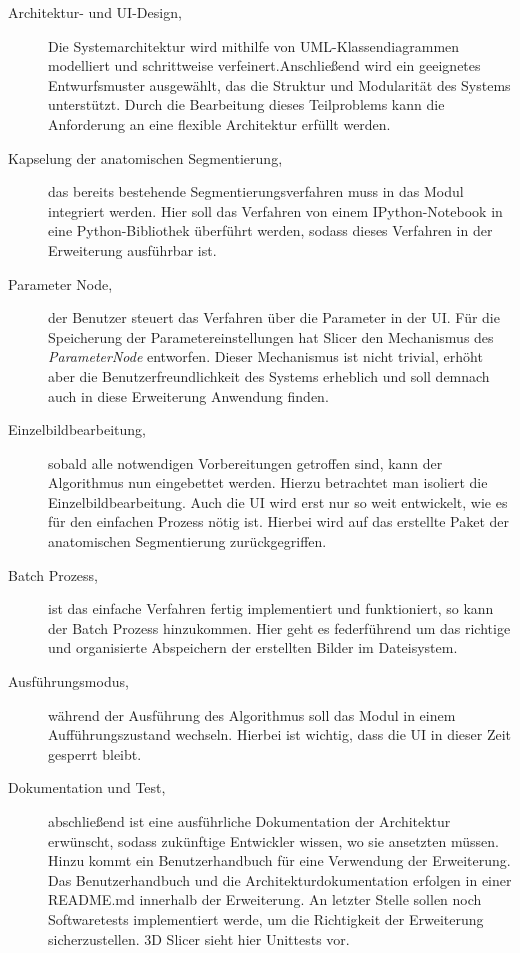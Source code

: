 \begin{description}
	\item[Architektur- und \ac{UI}-Design,] Die Systemarchitektur wird mithilfe von
		\ac{UML}-Klassendiagrammen modelliert und schrittweise verfeinert.Anschließend
		wird ein geeignetes Entwurfsmuster ausgewählt, das die Struktur und Modularität
		des Systems unterstützt. Durch die Bearbeitung dieses Teilproblems kann die
		Anforderung an eine flexible Architektur erfüllt werden.

	\item[Kapselung der anatomischen Segmentierung,] das bereits bestehende Segmentierungsverfahren
		muss in das Modul integriert werden. Hier soll das Verfahren von einem
		IPython-Notebook in eine Python-Bibliothek überführt werden, sodass dieses Verfahren
		in der Erweiterung ausführbar ist.

	\item[Parameter Node,] der Benutzer steuert das Verfahren über die Parameter in
		der \ac{UI}. Für die Speicherung der Parametereinstellungen hat Slicer den Mechanismus
		des \textit{ParameterNode} entworfen. Dieser Mechanismus ist nicht trivial,
		erhöht aber die Benutzerfreundlichkeit des Systems erheblich und soll
		demnach auch in diese Erweiterung Anwendung finden.

	\item[Einzelbildbearbeitung,] sobald alle notwendigen Vorbereitungen getroffen
		sind, kann der Algorithmus nun eingebettet werden. Hierzu betrachtet man isoliert
		die Einzelbildbearbeitung. Auch die \ac{UI} wird erst nur so weit entwickelt,
		wie es für den einfachen Prozess nötig ist. Hierbei wird auf das erstellte Paket
		der anatomischen Segmentierung zurückgegriffen.

	\item[Batch Prozess,] ist das einfache Verfahren fertig implementiert und funktioniert,
		so kann der Batch Prozess hinzukommen. Hier geht es federführend um das richtige
		und organisierte Abspeichern der erstellten Bilder im Dateisystem.

	\item[Ausführungsmodus,] während der Ausführung des Algorithmus soll das Modul
		in einem Aufführungszustand wechseln. Hierbei ist wichtig, dass die \ac{UI}
		in dieser Zeit gesperrt bleibt.

	\item[Dokumentation und Test,] abschließend ist eine ausführliche Dokumentation
		der Architektur erwünscht, sodass zukünftige Entwickler wissen, wo sie ansetzten
		müssen. Hinzu kommt ein Benutzerhandbuch für eine Verwendung der Erweiterung.
		Das Benutzerhandbuch und die Architekturdokumentation erfolgen in einer README.md
		innerhalb der Erweiterung. An letzter Stelle sollen noch Softwaretests
		implementiert werde, um die Richtigkeit der Erweiterung sicherzustellen. 3D
		Slicer sieht hier Unittests vor.
\end{description}

